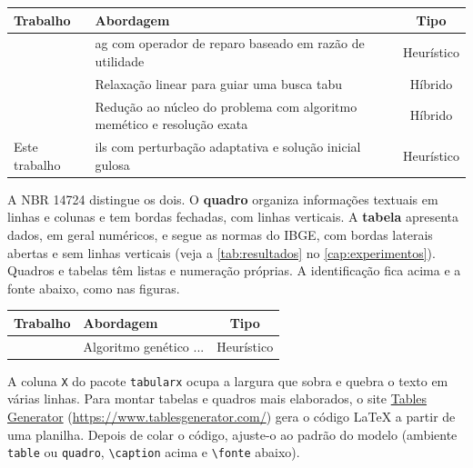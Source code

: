 \begin{quadro}[htbp]
  \centering
  \caption{Comparação entre os trabalhos relacionados e a proposta}
  \label{qua:relacionados}
  \small
  \begin{tabularx}{\textwidth}{|l|X|c|}
    \hline
    \textbf{Trabalho} & \textbf{Abordagem} & \textbf{Tipo} \\
    \hline
    \textcite{chu1998genetic} & \Acs{ag} com operador de reparo baseado em
      razão de utilidade & Heurístico \\
    \hline
    \textcite{vasquez2001hybrid} & Relaxação linear para guiar uma busca tabu
      & Híbrido \\
    \hline
    \textcite{puchinger2010multidimensional} & Redução ao núcleo do problema
      com algoritmo memético e resolução exata & Híbrido \\
    \hline
    Este trabalho & \Acs{ils} com perturbação adaptativa e solução inicial gulosa
      & Heurístico \\
    \hline
  \end{tabularx}
  \fonteautor
\end{quadro}

\begin{instrucao}
A NBR 14724 distingue os dois. O \textbf{quadro} organiza informações
textuais em linhas e colunas e tem bordas fechadas, com linhas verticais. A
\textbf{tabela} apresenta dados, em geral numéricos, e segue as normas do
IBGE, com bordas laterais abertas e sem linhas verticais (veja a
\cref{tab:resultados} no \cref{cap:experimentos}). Quadros e tabelas têm listas
e numeração próprias. A identificação fica acima e a fonte abaixo, como nas
figuras.
\begin{exemplocodigo}
\begin{quadro}[htbp]
  \centering
  \caption{Comparação entre os trabalhos}
  \label{qua:relacionados}
  \small
  \begin{tabularx}{\textwidth}{|l|X|c|}
    \hline
    \textbf{Trabalho} & \textbf{Abordagem} & \textbf{Tipo} \\
    \hline
    \textcite{chu1998genetic} & Algoritmo genético ... & Heurístico \\
    \hline
  \end{tabularx}
  \fonteautor
\end{quadro}
\end{exemplocodigo}
A coluna \verb|X| do pacote \verb|tabularx| ocupa a largura que sobra e quebra
o texto em várias linhas. Para montar tabelas e quadros mais elaborados, o site
\href{https://www.tablesgenerator.com/}{Tables Generator}
(\url{https://www.tablesgenerator.com/}) gera o código LaTeX a partir de uma
planilha. Depois de colar o código, ajuste-o ao padrão do modelo (ambiente
\verb|table| ou \verb|quadro|, \verb|\caption| acima e \verb|\fonte| abaixo).
\end{instrucao}
